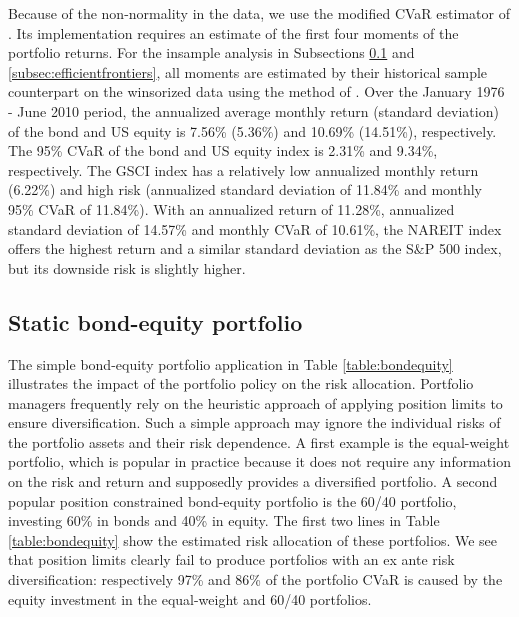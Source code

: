 \documentclass[12pt,a4paper]{article}
\begin{document}
Because of the non-normality in the data, we use the modified CVaR estimator of \citet{Boudt2007}. Its implementation requires an estimate of the first four moments of the portfolio returns. For the insample analysis in Subsections \ref{subsec:bondequity} and \ref{subsec:efficientfrontiers}, all moments are estimated by their historical sample counterpart on the winsorized data using the method of \citet{Boudt2007}. Over the January 1976 - June 2010 period, the annualized average monthly return (standard deviation) of the bond and US equity is 7.56\% (5.36\%) and 10.69\% (14.51\%), respectively. The 95\% CVaR of the bond and US equity index is 2.31\% and 9.34\%, respectively. The GSCI index has a relatively low annualized monthly return (6.22\%) and high risk (annualized standard deviation of 11.84\% and monthly 95\% CVaR of 11.84\%). With an annualized return of 11.28\%, annualized standard deviation of 14.57\% and monthly CVaR of 10.61\%, the NAREIT index offers the highest return and a similar standard deviation as the S\&P 500 index, but its downside risk is slightly higher.






\subsection{Static bond-equity portfolio}\label{subsec:bondequity}

The simple bond-equity portfolio application in Table \ref{table:bondequity} illustrates the impact of the portfolio policy on the risk allocation. Portfolio managers frequently rely on the heuristic approach of applying position limits to ensure diversification. Such a simple approach may ignore the individual risks of the portfolio assets and their risk dependence. A first example is the equal-weight portfolio, which is popular in practice because it does not require any information on the risk and return and supposedly provides a diversified portfolio. A second popular position constrained bond-equity portfolio is the 60/40 portfolio, investing 60\% in bonds and 40\% in equity. The first two lines in Table \ref{table:bondequity} show the estimated risk allocation of these portfolios.  We see that position limits clearly fail to produce portfolios with an ex ante risk diversification:  respectively 97\% and 86\% of the portfolio CVaR is caused by the equity investment in the equal-weight and 60/40 portfolios.
\end{document}
